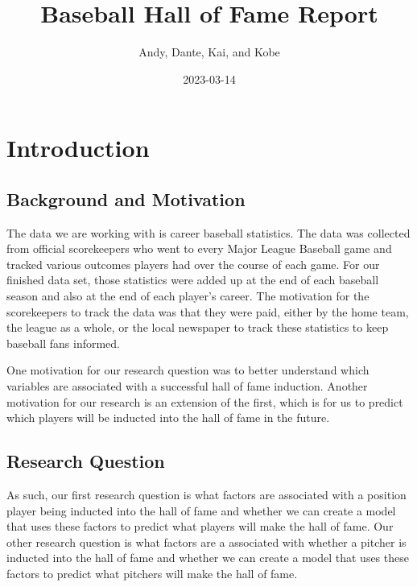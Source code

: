 \documentclass[
]{article}
\title{Baseball Hall of Fame Report}
\author{Andy, Dante, Kai, and Kobe}
\date{2023-03-14}
\begin{document}
\maketitle

\fontsize{9}{13}
\selectfont

\hypertarget{introduction}{%
\section{Introduction}\label{introduction}}

\hypertarget{background-and-motivation}{%
\subsection{Background and Motivation}\label{background-and-motivation}}

The data we are working with is career baseball statistics. The data was
collected from official scorekeepers who went to every Major League
Baseball game and tracked various outcomes players had over the course
of each game. For our finished data set, those statistics were added up
at the end of each baseball season and also at the end of each player's
career. The motivation for the scorekeepers to track the data was that
they were paid, either by the home team, the league as a whole, or the
local newspaper to track these statistics to keep baseball fans
informed.

One motivation for our research question was to better understand which
variables are associated with a successful hall of fame induction.
Another motivation for our research is an extension of the first, which
is for us to predict which players will be inducted into the hall of
fame in the future.

\hypertarget{research-question}{%
\subsection{Research Question}\label{research-question}}

As such, our first research question is what factors are associated with
a position player being inducted into the hall of fame and whether we
can create a model that uses these factors to predict what players will
make the hall of fame. Our other research question is what factors are a
associated with whether a pitcher is inducted into the hall of fame and
whether we can create a model that uses these factors to predict what
pitchers will make the hall of fame.
\end{document}
